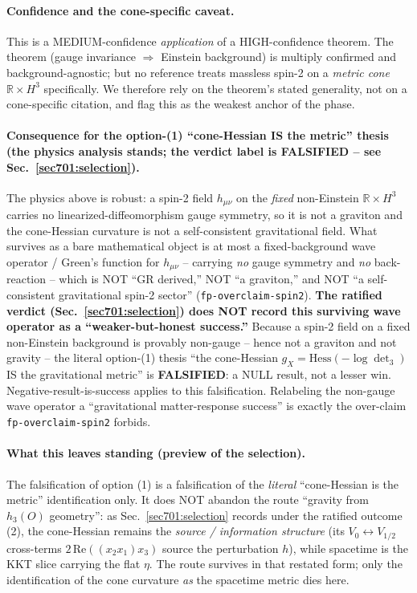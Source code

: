 \paragraph{Confidence and the cone-specific caveat.} This is a MEDIUM-confidence
\emph{application} of a HIGH-confidence theorem. The theorem (gauge invariance
$\Rightarrow$ Einstein background) is multiply confirmed and background-agnostic; but no
reference treats massless spin-2 on a \emph{metric cone} $\mathbb{R}\times H^3$
specifically. We therefore rely on the theorem's stated generality, not on a
cone-specific citation, and flag this as the weakest anchor of the phase.

\paragraph{Consequence for the option-(1) ``cone-Hessian IS the metric'' thesis (the
physics analysis stands; the verdict label is FALSIFIED -- see
Sec.~\ref{sec701:selection}).} The physics above is robust: a spin-2 field $h_{\mu\nu}$
on the \emph{fixed} non-Einstein $\mathbb{R}\times H^3$ carries no linearized-diffeomorphism
gauge symmetry, so it is not a graviton and the cone-Hessian curvature is not a
self-consistent gravitational field. What survives as a bare mathematical object is at
most a fixed-background wave operator / Green's function for $h_{\mu\nu}$ -- carrying
\emph{no} gauge symmetry and \emph{no} back-reaction -- which is NOT ``GR derived,'' NOT
``a graviton,'' and NOT ``a self-consistent gravitational spin-2 sector''
(\texttt{fp-overclaim-spin2}). \textbf{The ratified verdict (Sec.~\ref{sec701:selection})
does NOT record this surviving wave operator as a ``weaker-but-honest success.''} Because
a spin-2 field on a fixed non-Einstein background is provably non-gauge -- hence not a
graviton and not gravity -- the literal option-(1) thesis ``the cone-Hessian
$g_X=\mathrm{Hess}(-\log\det_3)$ IS the gravitational metric'' is \textbf{FALSIFIED}: a
NULL result, not a lesser win. Negative-result-is-success applies to this falsification.
Relabeling the non-gauge wave operator a ``gravitational matter-response success'' is
exactly the over-claim \texttt{fp-overclaim-spin2} forbids.

\paragraph{What this leaves standing (preview of the selection).} The falsification of
option (1) is a falsification of the \emph{literal} ``cone-Hessian is the metric''
identification only. It does NOT abandon the route ``gravity from $h_3(O)$ geometry'': as
Sec.~\ref{sec701:selection} records under the ratified outcome (2), the cone-Hessian
remains the \emph{source / information structure} (its $V_0\!\leftrightarrow\!V_{1/2}$
cross-terms $2\,\mathrm{Re}((x_2 x_1)x_3)$ source the perturbation $h$), while spacetime
is the KKT slice carrying the flat $\eta$. The route survives in that restated form; only
the identification of the cone curvature \emph{as} the spacetime metric dies here.

